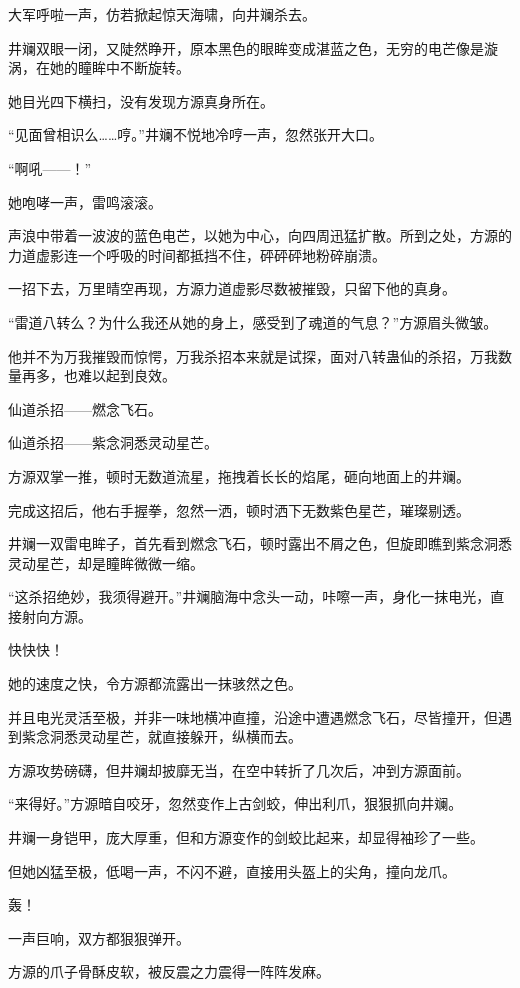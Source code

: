 \begin{this_body}
大军呼啦一声，仿若掀起惊天海啸，向井斓杀去。

井斓双眼一闭，又陡然睁开，原本黑色的眼眸变成湛蓝之色，无穷的电芒像是漩涡，在她的瞳眸中不断旋转。

她目光四下横扫，没有发现方源真身所在。

“见面曾相识么……哼。”井斓不悦地冷哼一声，忽然张开大口。

“啊吼——！”

她咆哮一声，雷鸣滚滚。

声浪中带着一波波的蓝色电芒，以她为中心，向四周迅猛扩散。所到之处，方源的力道虚影连一个呼吸的时间都抵挡不住，砰砰砰地粉碎崩溃。

一招下去，万里晴空再现，方源力道虚影尽数被摧毁，只留下他的真身。

“雷道八转么？为什么我还从她的身上，感受到了魂道的气息？”方源眉头微皱。

他并不为万我摧毁而惊愕，万我杀招本来就是试探，面对八转蛊仙的杀招，万我数量再多，也难以起到良效。

仙道杀招——燃念飞石。

仙道杀招——紫念洞悉灵动星芒。

方源双掌一推，顿时无数道流星，拖拽着长长的焰尾，砸向地面上的井斓。

完成这招后，他右手握拳，忽然一洒，顿时洒下无数紫色星芒，璀璨剔透。

井斓一双雷电眸子，首先看到燃念飞石，顿时露出不屑之色，但旋即瞧到紫念洞悉灵动星芒，却是瞳眸微微一缩。

“这杀招绝妙，我须得避开。”井斓脑海中念头一动，咔嚓一声，身化一抹电光，直接射向方源。

快快快！

她的速度之快，令方源都流露出一抹骇然之色。

并且电光灵活至极，并非一味地横冲直撞，沿途中遭遇燃念飞石，尽皆撞开，但遇到紫念洞悉灵动星芒，就直接躲开，纵横而去。

方源攻势磅礴，但井斓却披靡无当，在空中转折了几次后，冲到方源面前。

“来得好。”方源暗自咬牙，忽然变作上古剑蛟，伸出利爪，狠狠抓向井斓。

井斓一身铠甲，庞大厚重，但和方源变作的剑蛟比起来，却显得袖珍了一些。

但她凶猛至极，低喝一声，不闪不避，直接用头盔上的尖角，撞向龙爪。

轰！

一声巨响，双方都狠狠弹开。

方源的爪子骨酥皮软，被反震之力震得一阵阵发麻。


\end{this_body}
